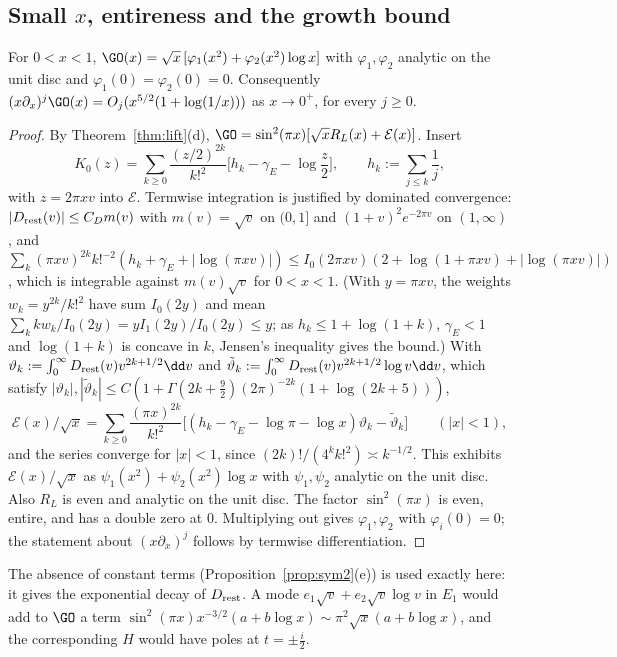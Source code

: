 \subsection{Small \texorpdfstring{$x$}{x}, entireness and the growth bound}

\begin{lemma}[Small $x$]\label{lem:small-x}
For $0<x<1$, $\GO(x)=\sqrt x\,[\varphi_1(x^2)+\varphi_2(x^2)\log x]$ with $\varphi_1,\varphi_2$ analytic on the unit disc and
$\varphi_1(0)=\varphi_2(0)=0$. Consequently $(x\partial_x)^j\GO(x)=O_j(x^{5/2}(1+\log(1/x)))$ as $x\to0^+$, for every $j\ge0$.
\end{lemma}

\begin{proof}
By Theorem~\ref{thm:lift}(d), $\GO=\sin^2(\pi x)[\sqrt xR_L(x)+\mathcal E(x)]$. Insert
\[
K_0(z)=\sum_{k\ge0}\frac{(z/2)^{2k}}{k!^2}\Big[h_k-\gamma_E-\log\frac z2\Big],\qquad h_k:=\sum_{j\le k}\frac1j,
\]
\cite[10.31.2]{DLMF} with $z=2\pi xv$ into $\mathcal E$. Termwise
integration is justified by dominated convergence: $|D_{\rm rest}(v)|\le C_Dm(v)$ with $m(v)=\sqrt v$ on $(0,1]$ and $(1+v)^2e^{-2\pi v}$ on $(1,\infty)$,
and $\sum_k(\pi xv)^{2k}k!^{-2}(h_k+\gamma_E+|\log(\pi xv)|)\le I_0(2\pi xv)(2+\log(1+\pi xv)+|\log(\pi xv)|)$, which is integrable against $m(v)\sqrt v$ for
$0<x<1$. (With $y=\pi xv$, the weights $w_k=y^{2k}/k!^2$ have sum $I_0(2y)$ and mean $\sum_kkw_k/I_0(2y)=yI_1(2y)/I_0(2y)\le y$; as
$h_k\le1+\log(1+k)$, $\gamma_E<1$ and $\log(1+k)$ is concave in $k$, Jensen's inequality gives the bound.) With $\vartheta_k:=\int_0^\infty D_{\rm rest}(v)v^{2k+1/2}\dd v$ and $\tilde\vartheta_k:=\int_0^\infty D_{\rm rest}(v)v^{2k+1/2}\log v\dd v$, which satisfy
$|\vartheta_k|,|\tilde\vartheta_k|\le C(1+\Gamma(2k+\frac92)(2\pi)^{-2k}(1+\log(2k+5)))$,
\[
\mathcal E(x)/\sqrt x=\sum_{k\ge0}\frac{(\pi x)^{2k}}{k!^2}\big[(h_k-\gamma_E-\log\pi-\log x)\vartheta_k-\tilde\vartheta_k\big]\qquad(|x|<1),
\]
and the series converge for $|x|<1$, since $(2k)!/(4^kk!^2)\asymp k^{-1/2}$. This exhibits $\mathcal E(x)/\sqrt x$ as $\psi_1(x^2)+\psi_2(x^2)\log x$
with $\psi_1,\psi_2$ analytic on the unit disc. Also $R_L$ is even and analytic on the unit disc. The factor $\sin^2(\pi x)$ is even, entire,
and has a double zero at $0$. Multiplying out gives $\varphi_1,\varphi_2$ with $\varphi_i(0)=0$; the statement about $(x\partial_x)^j$ follows by
termwise differentiation.
\end{proof}

The absence of constant terms (Proposition~\ref{prop:sym2}(e)) is used exactly here: it gives the exponential decay of $D_{\rm rest}$. A mode
$e_1\sqrt v+e_2\sqrt v\log v$ in $E_1$ would add to $\GO$ a term $\sin^2(\pi x)x^{-3/2}(a+b\log x)\sim\pi^2\sqrt x(a+b\log x)$, and the
corresponding $H$ would have poles at $t=\pm\frac i2$.

